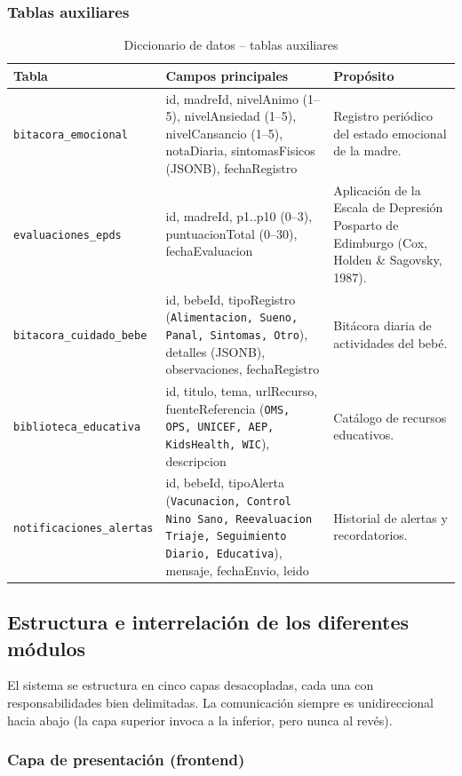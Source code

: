 \documentclass[12pt,letterpaper]{article}
\begin{document}
\subsubsection{Tablas auxiliares}

\begin{longtable}{p{}p{}p{}}
\caption{Diccionario de datos -- tablas auxiliares}\\\toprule
\textbf{Tabla} & \textbf{Campos principales} & \textbf{Propósito} \\\midrule
\endhead
\texttt{bitacora\_emocional} & id, madreId, nivelAnimo (1--5), nivelAnsiedad (1--5), nivelCansancio (1--5), notaDiaria, sintomasFisicos (JSONB), fechaRegistro & Registro periódico del estado emocional de la madre.\\\hline
\texttt{evaluaciones\_epds} & id, madreId, p1..p10 (0--3), puntuacionTotal (0--30), fechaEvaluacion & Aplicación de la Escala de Depresión Posparto de Edimburgo (Cox, Holden \& Sagovsky, 1987).\\\hline
\texttt{bitacora\_cuidado\_bebe} & id, bebeId, tipoRegistro (\texttt{Alimentacion, Sueno, Panal, Sintomas, Otro}), detalles (JSONB), observaciones, fechaRegistro & Bitácora diaria de actividades del bebé.\\\hline
\texttt{biblioteca\_educativa} & id, titulo, tema, urlRecurso, fuenteReferencia (\texttt{OMS, OPS, UNICEF, AEP, KidsHealth, WIC}), descripcion & Catálogo de recursos educativos.\\\hline
\texttt{notificaciones\_alertas} & id, bebeId, tipoAlerta (\texttt{Vacunacion, Control Nino Sano, Reevaluacion Triaje, Seguimiento Diario, Educativa}), mensaje, fechaEnvio, leido & Historial de alertas y recordatorios.\\\bottomrule
\end{longtable}

\subsection{Estructura e interrelación de los diferentes módulos}

El sistema se estructura en cinco capas desacopladas, cada una con responsabilidades bien delimitadas. La comunicación siempre es unidireccional hacia abajo (la capa superior invoca a la inferior, pero nunca al revés).

\subsubsection{Capa de presentación (frontend)}
\end{document}
